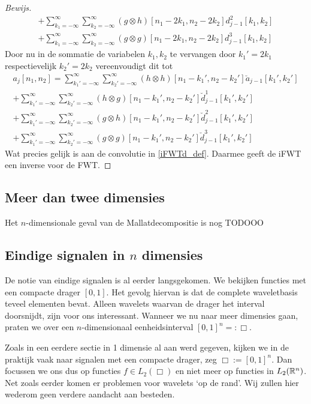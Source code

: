 \begin{proof}[Bewijs]
\begin{equation*}
\begin{split}
      + \sum_{k_1=-\infty}^\infty\sum_{k_2=-\infty}^\infty 
      (g\otimes h)[n_1-2k_1,n_2-2k_2] d^2_{j-1}[k_1,k_2] \\
      + \sum_{k_1=-\infty}^\infty\sum_{k_2=-\infty}^\infty 
      (g\otimes g)[n_1-2k_1,n_2-2k_2] d^3_{j-1}[k_1,k_2]
      \end{split}
  \end{equation*}
  Door nu in de sommatie de variabelen $k_1,k_2$ te vervangen door $k_1'=2k_1$ respectievelijk $k_2'=2k_2$ 
  vereenvoudigt dit tot
  \begin{equation*}
    \begin{split}
      a_{j}[n_1,n_2] = 
      \sum_{k_1'=-\infty}^\infty\sum_{k_2'=-\infty}^\infty 
      (h\otimes h)[n_1-k_1',n_2-k_2'] \breve a_{j-1}[k_1',k_2'] \\
      + \sum_{k_1'=-\infty}^\infty\sum_{k_2'=-\infty}^\infty 
      (h\otimes g)[n_1-k_1',n_2-k_2'] \breve d^1_{j-1}[k_1',k_2'] \\
      + \sum_{k_1'=-\infty}^\infty\sum_{k_2'=-\infty}^\infty 
      (g\otimes h)[n_1-k_1',n_2-k_2'] \breve d^2_{j-1}[k_1',k_2'] \\
      + \sum_{k_1'=-\infty}^\infty\sum_{k_2'=-\infty}^\infty 
      (g\otimes g)[n_1-k_1',n_2-k_2'] \breve d^3_{j-1}[k_1',k_2']
      \end{split}
  \end{equation*}
  Wat precies gelijk is aan de convolutie in \ref{iFWTd_def}. Daarmee geeft de iFWT een inverse voor de FWT.
\end{proof}

\subsection{Meer dan twee dimensies}
Het $n$-dimensionale geval van de Mallatdecompositie is nog TODOOO

\subsection{Eindige signalen in $n$ dimensies}
De notie van eindige signalen is al eerder langsgekomen. We bekijken functies met een compacte drager $[0,1]$. Het gevolg hiervan is dat de complete waveletbasis teveel elementen bevat. Alleen wavelets waarvan de drager het interval doorsnijdt, zijn voor ons interessant. Wanneer we nu naar meer dimensies gaan, praten we over een $n$-dimensionaal eenheidsinterval $[0,1]^n =: \Box$. 

\iffalse
Zoals in een eerdere sectie in 1 dimensie al aan werd gegeven, kijken we in de praktijk vaak naar signalen met een compacte drager, zeg $\Box := [0,1]^n$. Dan focussen we ons dus op functies $f \in L_2(\Box)$ en niet meer op functies in $L_2(\mathbb{R}^n)$. Net zoals eerder komen er problemen voor wavelets `op de rand'. Wij zullen hier wederom geen verdere aandacht aan besteden.

